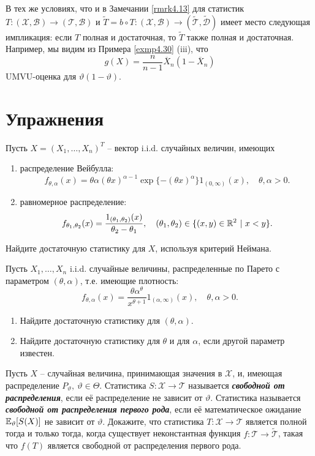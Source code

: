 \begin{rmrk} \label{rmrk4.31}
	В тех же условиях, что и в Замечании \ref{rmrk4.13} для статистик $T:(\mathcal{X}, \mathcal{B}) \rightarrow (\mathcal{T}, \mathcal{B})$ и $\widetilde{T} = b \circ T : (\mathcal{X}, \mathcal{B}) \rightarrow (\widetilde{\mathcal{T}}, \widetilde{\mathcal{D}})$ имеет место следующая импликация: если $T$ полная и достаточная, то $\widetilde{T}$ также полная и достаточная. Например, мы видим из Примера \ref{exmp4.30} (iii), что
	\[ g(X) = \frac{n}{n-1}\overline{X}_n(1-\overline{X}_n) \]
	UMVU-оценка для $\vartheta(1-\vartheta)$.
\end{rmrk}

\raggedbottom
\pagebreak
\section*{Упражнения}
\begin{exc}
	Пусть $X = (X_1, \dots, X_n)^T$ -- вектор i.i.d. случайных величин, имеющих
	\begin{enumerate}
		\item распределение Вейбулла:
		\[ f_{\theta, \alpha}(x) = \theta \alpha(\theta x)^{\alpha - 1} \exp\{-(\theta x)^\alpha\} 1_{(0, \infty)}(x), \quad \theta, \alpha > 0.  \]
		\item равномерное распределение:
		\[ f_{\theta_1, \theta_2}(x)=  \frac{1_{(\theta_1, \theta_2)}(x)}{\theta_2 - \theta_1}, \quad (\theta_1, \theta_2) \in \{(x, y) \in \mathbb{R}^2 \ |\ x < y \}.\]
	\end{enumerate}
	Найдите достаточную статистику для $X$, используя критерий Неймана.
\end{exc}

\begin{exc}
	Пусть $X_1, \dots, X_n$ i.i.d. случайные величины, распределенные по Парето с параметром $(\theta, \alpha)$, т.е. имеющие плотность:
	\[ f_{\theta,\alpha}(x) = \frac{\theta \alpha^\theta}{x^{\theta + 1}} 1_{(\alpha, \infty)}(x), \quad \theta, \alpha > 0.  \]
	\begin{enumerate}
		\item Найдите достаточную статистику для $(\theta, \alpha)$.
		\item Найдите достаточную статистику для $\theta$ и для $\alpha$, если другой параметр известен.
	\end{enumerate}
\end{exc}

\begin{exc}
	Пусть $X$ -- случайная величина, принимающая значения в $\mathcal{X}$, и, имеющая распределение $P_\vartheta,\ \vartheta \in \Theta$. Статистика $S: \mathcal{X} \rightarrow \mathcal{T}$ называется \textbf{\textit{свободной от распределения}}, если её распределение не зависит от $\vartheta$. Статистика называется \textbf{\textit{свободной от распределения первого рода}}, если её математическое ожидание $\mathbb{E}_\vartheta[S(X)]$ не зависит от $\vartheta$. Докажите, что статистика $T: \mathcal{X} \rightarrow \mathcal{T}$ является полной тогда и только тогда, когда существует неконстантная функция $f:\mathcal{T} \rightarrow \widetilde{\mathcal{T}}$, такая что $f(T)$ является свободной от распределения первого рода.
\end{exc}

